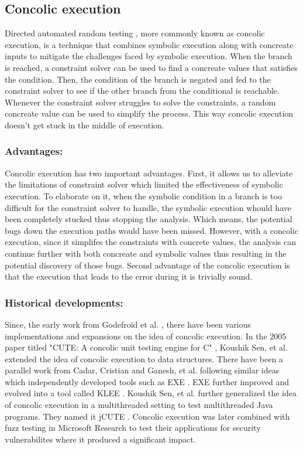 \documentclass[	runningheads,
				a4paper]{llncs}
\begin{document}
\subsection{Concolic execution}
Directed automated random testing \cite[DART]{godefroid2005dart}, more commonly known as concolic execution, is a technique that combines symbolic execution along with concreate inputs to mitigate the challenges faced by symbolic execution. When the branch is reached, a constraint solver can be used to find a concreate values that satisfies the condition. Then, the condition of the branch is negated and fed to the constraint solver to see if the other branch from the conditional is reachable. Whenever the constraint solver struggles to solve the constraints, a random concreate value can be used to simplify the process. This way concolic execution doesn't get stuck in the middle of execution.

\subsubsection{Advantages:}
Concolic execution has two important advantages. First, it allows us to alleviate the limitations of constraint solver which limited the effectiveness of symbolic execution. To elaborate on it, when the symbolic condition in a branch is too difficult for the constraint solver to handle, the symbolic execution whould have been completely stucked thus stopping the analysis. Which means, the potential bugs down the execution paths would have been missed. However, with a concolic execution, since it simplifes the constraints with concrete values, the analysis can continue further with both concreate and symbolic values thus resulting in the potential discovery of those bugs. Second advantage of the concolic execution is that the execution that leads to the error during it is trivially sound.

\subsubsection{Historical developments:}
Since, the early work from Godefroid et al. \cite{godefroid2005dart}, there have been various implementations and expansions on the idea of concolic execution. In the 2005 paper titled "CUTE: A concolic unit testing engine for C" \cite{sen2005cute}, Koushik Sen, et al. extended the idea of concolic execution to data structures. There have been a parallel work from Cadar, Cristian and Ganesh, et al. following similar ideas which independently developed tools such as EXE \cite{cadar2008exe}. EXE further improved and evolved into a tool called KLEE \cite{cadar2008klee}.  Koushik Sen, et al. further generalized the idea of concolic execution in a multithreaded setting to test multithreaded Java programs. They named it jCUTE \cite{sen2006cute}. Concolic execution was later combined with fuzz testing in Microsoft Research \cite[SAGE]{godefroid2012sage} to test their applications for security vulnerabilites where it produced a significant impact.
\end{document}
